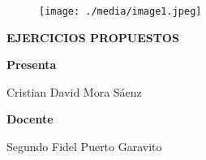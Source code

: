\documentclass[12pt]{article}
\renewcommand{\_}{\kern-1.5pt\textunderscore\kern-1.5pt}
\begin{document}

\begin{figure}[H]
	\begin{Center}
		\texttt{[image: ./media/image1.jpeg]}
	\end{Center}
\end{figure}



\par

\begin{Center}
{\fontsize{14pt}{16.8pt}\selectfont \textbf{EJERCICIOS PROPUESTOS}\par}
\end{Center}\par


\vspace{\baselineskip}

\vspace{\baselineskip}
\begin{Center}
{\fontsize{14pt}{16.8pt}\selectfont \textbf{Presenta}\par}
\end{Center}\par

\begin{Center}
{\fontsize{14pt}{16.8pt}\selectfont Cristian David Mora Sáenz\par}
\end{Center}\par


\vspace{\baselineskip}

\vspace{\baselineskip}

\vspace{\baselineskip}
\begin{Center}
{\fontsize{14pt}{16.8pt}\selectfont \textbf{Docente }\par}
\end{Center}\par

\begin{Center}
{\fontsize{14pt}{16.8pt}\selectfont Segundo Fidel Puerto Garavito\par}
\end{Center}\par
\end{document}
